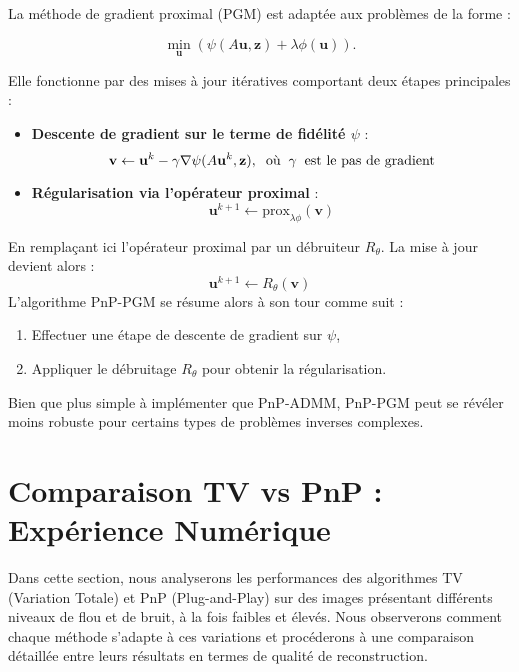 \documentclass[a4paper, 12pt]{report} %
\begin{document}
La méthode de gradient proximal (PGM) est adaptée aux problèmes de la forme :

\[
\min_{\mathbf{u}} \left( \psi(A\mathbf{u}, \mathbf{z}) + \lambda \phi(\mathbf{u}) \right).
\]

Elle fonctionne par des mises à jour itératives comportant deux étapes principales :

\begin{itemize}
    \item \textbf{Descente de gradient sur le terme de fidélité \( \psi \)} :
    \[
    \mathbf{v} \leftarrow \mathbf{u}^k - \gamma \nabla \psi(A\mathbf{u}^k, \mathbf{z}),
    \hspace{0.2 cm} \text{où} \hspace{0.2 cm}  \gamma \hspace{0.2 cm} \text{est le pas de gradient}
    \]
    \item \textbf{Régularisation via l’opérateur proximal} :
    \[
    \mathbf{u}^{k+1} \leftarrow \text{prox}_{\lambda \phi}(\mathbf{v})
    \]
\end{itemize}
En remplaçant ici l'opérateur proximal par un débruiteur \( R_\theta \). La mise à jour devient alors :
\[
\mathbf{u}^{k+1} \leftarrow R_\theta(\mathbf{v})
\]
L’algorithme PnP-PGM se résume alors à son tour comme suit :
\begin{enumerate}
    \item Effectuer une étape de descente de gradient sur \( \psi \),
    \item Appliquer le débruitage \( R_\theta \) pour obtenir la régularisation.
\end{enumerate}

Bien que plus simple à implémenter que PnP-ADMM, PnP-PGM peut se révéler moins robuste pour certains types de problèmes inverses complexes.



\section{Comparaison TV vs PnP : Expérience Numérique} 

Dans cette section, nous analyserons les performances des algorithmes TV (Variation Totale) et PnP (Plug-and-Play) sur des images présentant différents niveaux de flou et de bruit, à la fois faibles et élevés. Nous observerons comment chaque méthode s’adapte à ces variations et procéderons à une comparaison détaillée entre leurs résultats en termes de qualité de reconstruction.
\end{document}
